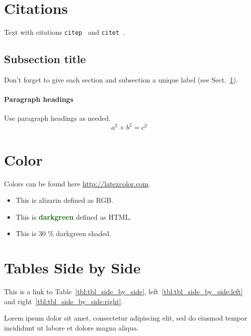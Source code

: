\documentclass[natbib,table]{svjour3}                     %
\begin{document}
\section{Citations}
\label{sec:1}
Text with citations \texttt{citep}~\citep{comics/marvel/StarkR18} and \texttt{citet}~\citet{Goossens:1994:LC:561206}.
\subsection{Subsection title}
\label{sec:2}
Don't forget to give each section and subsection a unique label (see Sect.~\ref{sec:1}).
\paragraph{Paragraph headings} Use paragraph headings as needed.
\begin{equation}
a^2+b^2=c^2
\end{equation}
\blindtext[1]

\section{Color}
Colors can be found here \url{http://latexcolor.com}.
\begin{itemize}
  \item This is \textcolor{alizarin}{alizarin} defined as RGB.
  \item This is \textcolor{darkgreen}{\textbf{darkgreen}} defined as HTML.
  \item This is \colorbox{darkgreen30}{30 \% darkgreen} shaded.
\end{itemize}


\section{Tables Side by Side}
This is a link to Table~\ref{tbl:tbl_side_by_side}, left~\ref{tbl:tbl_side_by_side:left} and right~\ref{tbl:tbl_side_by_side:right}.

Lorem ipsum dolor sit amet, consectetur adipiscing elit, sed do eiusmod tempor incididunt ut labore et dolore magna aliqua.

\blindtext[1]
\end{document}
